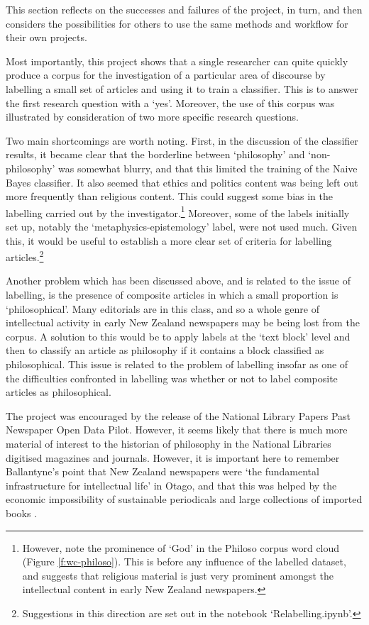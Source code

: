 \documentclass{article}
\begin{document}
This section reflects on the successes and failures of the project, in turn, and then considers the possibilities for others to use the same methods and workflow for their own projects.

Most importantly, this project shows that a single researcher can quite quickly produce a corpus for the investigation of a particular area of discourse by labelling a small set of articles and using it to train a classifier. This is to answer the first research question with a `yes'. Moreover, the use of this corpus was illustrated by consideration of two more specific research questions.

Two main shortcomings are worth noting. First, in the discussion of the classifier results, it became clear that the borderline between `philosophy' and `non-philosophy' was somewhat blurry, and that this limited the training of the Naive Bayes classifier. It also seemed that ethics and politics content was being left out more frequently than religious content. This could suggest some bias in the labelling carried out by the investigator.\footnote{However, note the prominence of `God' in the Philoso corpus word cloud (Figure \ref{f:wc-philoso}). This is before any influence of the labelled dataset, and suggests that religious material is just very prominent amongst the intellectual content in early New Zealand newspapers.}
Moreover, some of the labels initially set up, notably the `metaphysics-epistemology' label, were not used much. Given this, it would be useful to establish a more clear set of criteria for labelling articles.\footnote{Suggestions in this direction are set out in the notebook `Relabelling.ipynb'.}

Another problem which has been discussed above, and is related to the issue of labelling, is the presence of composite articles in which a small proportion is `philosophical'. Many editorials are in this class, and so a whole genre of intellectual activity in early New Zealand newspapers may be being lost from the corpus. A solution to this would be to apply labels at the `text block' level and then to classify an article as philosophy if it contains a block classified as philosophical. This issue is related to the problem of labelling insofar as one of the difficulties confronted in labelling was whether or not to label composite articles as philosophical.

The project was encouraged by the release of the National Library Papers Past Newspaper Open Data Pilot. However, it seems likely that there is much more material of interest to the historian of philosophy in the National Libraries digitised magazines and journals. However, it is important here to remember Ballantyne's point that New Zealand newspapers were `the fundamental infrastructure for intellectual life' in Otago, and that this was helped by the economic impossibility of sustainable periodicals and large collections of imported books \cite[57--58]{ballantyne-2012}.
\end{document}
